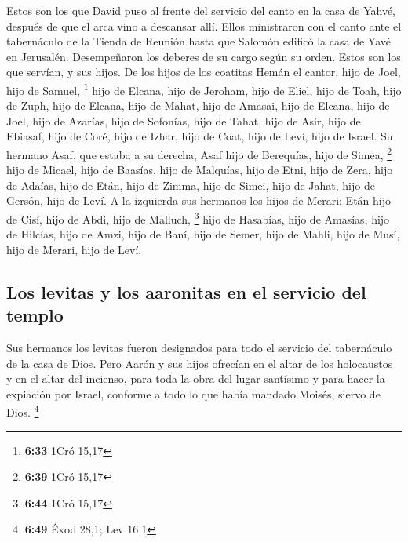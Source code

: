 \begin{paracol}{2}
 Estos son los que David puso al frente del servicio del
canto en la casa de Yahvé, después de que el arca vino a descansar allí.
 Ellos ministraron con el canto ante el tabernáculo de la
Tienda de Reunión hasta que Salomón edificó la casa de Yavé en
Jerusalén. Desempeñaron los deberes de su cargo según su orden.
 Estos son los que servían, y sus hijos. De los hijos de
los coatitas Hemán el cantor, hijo de Joel, hijo de Samuel, \footnote{\textbf{6:33}
  1Cró 15,17}  hijo de Elcana, hijo de Jeroham, hijo de
Eliel, hijo de Toah,  hijo de Zuph, hijo de Elcana, hijo
de Mahat, hijo de Amasai,  hijo de Elcana, hijo de Joel,
hijo de Azarías, hijo de Sofonías,  hijo de Tahat, hijo
de Asir, hijo de Ebiasaf, hijo de Coré,  hijo de Izhar,
hijo de Coat, hijo de Leví, hijo de Israel.  Su hermano
Asaf, que estaba a su derecha, Asaf hijo de Berequías, hijo de Simea,
\footnote{\textbf{6:39} 1Cró 15,17}  hijo de Micael, hijo
de Baasías, hijo de Malquías,  hijo de Etni, hijo de
Zera, hijo de Adaías,  hijo de Etán, hijo de Zimma, hijo
de Simei,  hijo de Jahat, hijo de Gersón, hijo de Leví.
 A la izquierda sus hermanos los hijos de Merari: Etán
hijo de Cisí, hijo de Abdi, hijo de Malluch, \footnote{\textbf{6:44}
  1Cró 15,17}  hijo de Hasabías, hijo de Amasías, hijo de
Hilcías,  hijo de Amzi, hijo de Baní, hijo de Semer,
 hijo de Mahli, hijo de Musí, hijo de Merari, hijo de
Leví.

\hypertarget{los-levitas-y-los-aaronitas-en-el-servicio-del-templo}{%
\subsection{Los levitas y los aaronitas en el servicio del
templo}\label{los-levitas-y-los-aaronitas-en-el-servicio-del-templo}}

 Sus hermanos los levitas fueron designados para todo el
servicio del tabernáculo de la casa de Dios.  Pero Aarón
y sus hijos ofrecían en el altar de los holocaustos y en el altar del
incienso, para toda la obra del lugar santísimo y para hacer la
expiación por Israel, conforme a todo lo que había mandado Moisés,
siervo de Dios. \footnote{\textbf{6:49} Éxod 28,1; Lev 16,1}

\hypertarget{segunda-luxednea-de-sumos-sacerdotes-desde-aaruxf3n-hasta-ahimaas}{%
}
\end{paracol}

